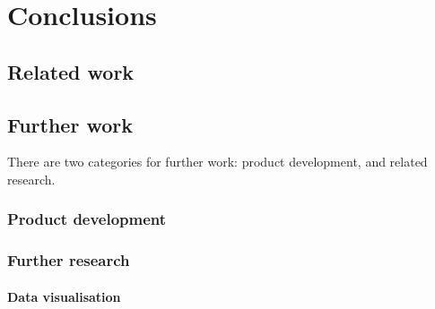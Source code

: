 \chapter{Conclusions}\label{chap:conclusions}








\cite{cummins2014pip-db}
\cite{cummins2014migrating}

\section{Related work}\label{sec:related-work}


\section{Further work}\label{sec:further-work}

There are two categories for further work: product development, and
related research.


\subsection{Product development}


\subsection{Further research}

\subsubsection*{Data visualisation}

